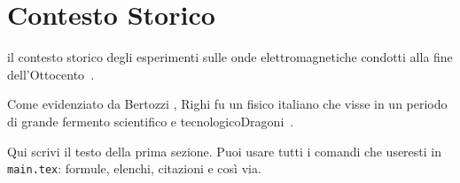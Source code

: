 \chapter{Contesto Storico}

il contesto storico degli esperimenti sulle
onde elettromagnetiche condotti alla fine dell'Ottocento~\cite{righi1897ottica}.

Come evidenziato da Bertozzi \cite{bertozzi2020augusto}, Righi fu un fisico italiano che visse in un periodo 
di grande fermento scientifico e tecnologicoDragoni~\cite{dragonirighi2023}.

Qui scrivi il testo della prima sezione. Puoi usare tutti i comandi
che useresti in \texttt{main.tex}: formule, elenchi, citazioni e così via.
